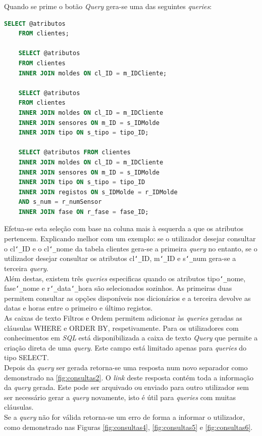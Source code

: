 \documentclass[11pt,twoside,a4paper]{report}
\begin{document}
\newpage
Quando  se prime o botão \textit{Query} gera-se uma das seguintes \textit{queries}:\\
\begin{lstlisting}[language = SQL]
	SELECT @atributos
	FROM clientes;
	
	SELECT @atributos
	FROM clientes
	INNER JOIN moldes ON cl_ID = m_IDCliente;
	
	SELECT @atributos
	FROM clientes
	INNER JOIN moldes ON cl_ID = m_IDCliente
	INNER JOIN sensores ON m_ID = s_IDMolde
	INNER JOIN tipo ON s_tipo = tipo_ID;
	
	SELECT @atributos FROM clientes
	INNER JOIN moldes ON cl_ID = m_IDCliente
	INNER JOIN sensores ON m_ID = s_IDMolde 
	INNER JOIN tipo ON s_tipo = tipo_ID
	INNER JOIN registos ON s_IDMolde = r_IDMolde
	AND s_num = r_numSensor
	INNER JOIN fase ON r_fase = fase_ID;
\end{lstlisting}
Efetua-se esta seleção com base na coluna mais à esquerda a que os atributos pertencem. Explicando melhor com um exemplo: se o utilizador desejar consultar o cl\texttt{\char`_}ID e o cl\texttt{\char`_}nome da tabela clientes gera-se a primeira \textit{query} no entanto, se o utilizador desejar consultar os atributos cl\texttt{\char`_}ID, m\texttt{\char`_}ID e s\texttt{\char`_}num gera-se a terceira \textit{query}.\\
Além destas, existem três \textit{queries} especificas quando os atributos tipo\texttt{\char`_}nome, fase\texttt{\char`_}nome e r\texttt{\char`_}data\texttt{\char`_}hora são selecionados sozinhos. As primeiras duas permitem consultar as opções disponíveis nos dicionários e a terceira devolve as datas e horas entre o primeiro e último registos.\\
As caixas de texto Filtros e Ordem permitem adicionar às \textit{queries} geradas as cláusulas WHERE e ORDER BY, respetivamente. Para os utilizadores com conhecimentos em \textit{SQL} está disponibilizada a caixa de texto \textit{Query} que permite a criação direta de uma \textit{query}. Este campo está limitado apenas para \textit{queries} do tipo SELECT.\\
Depois da \textit{query} ser gerada retorna-se uma resposta num novo separador como demonstrado na \autoref{fig:consultas2}. O \textit{link} deste resposta contém toda a informação da \textit{query} gerada. Este pode ser arquivado ou enviado para outro utilizador sem ser necessário gerar a \textit{query} novamente, isto é útil para \textit{queries} com muitas cláusulas.\\
Se a \textit{query} não for válida retorna-se um erro de forma a informar o utilizador, como demonstrado nas Figuras \ref{fig:consultas4}, \ref{fig:consultas5} e \ref{fig:consultas6}.
\end{document}
